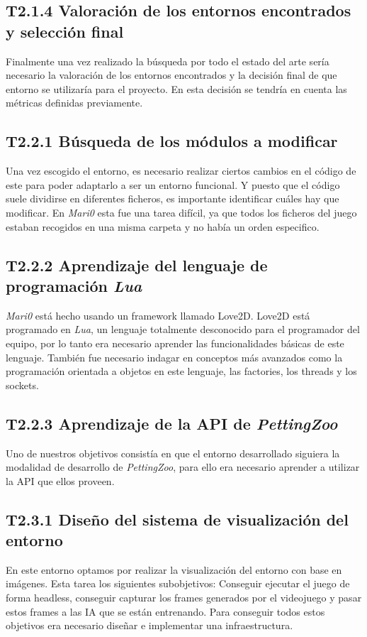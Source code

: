 \subsection*{T2.1.4 Valoración de los entornos encontrados y selección final}
Finalmente una vez realizado la búsqueda por todo el estado del arte sería necesario la valoración de los entornos encontrados y la decisión final de que entorno se utilizaría para el proyecto. En esta decisión se tendría en cuenta las métricas definidas previamente.

\subsection*{T2.2.1 Búsqueda de los módulos a modificar}
Una vez escogido el entorno, es necesario realizar ciertos cambios en el código de este para poder adaptarlo a ser un entorno funcional. Y puesto que el código suele dividirse en diferentes ficheros, es importante identificar cuáles hay que modificar. En \textit{Mari0} esta fue una tarea difícil, ya que todos los ficheros del juego estaban recogidos en una misma carpeta y no había un orden especifico.

\subsection*{T2.2.2 Aprendizaje del lenguaje de programación \textit{Lua}}
\textit{Mari0} está hecho usando un framework llamado Love2D. Love2D está programado en \textit{Lua}, un lenguaje totalmente desconocido para el programador del equipo, por lo tanto era necesario aprender las funcionalidades básicas de este lenguaje. También fue necesario indagar en conceptos más avanzados como la programación orientada a objetos en este lenguaje, las factories, los threads y los sockets.

\subsection*{T2.2.3 Aprendizaje de la API de \textit{PettingZoo}}
Uno de nuestros objetivos consistía en que el entorno desarrollado siguiera la modalidad de desarrollo de \textit{PettingZoo}, para ello era necesario aprender a utilizar la API que ellos proveen.

\subsection*{T2.3.1 Diseño del sistema de visualización del entorno}
En este entorno optamos por realizar la visualización del entorno con base en imágenes. Esta tarea los siguientes subobjetivos: Conseguir ejecutar el juego de forma headless, conseguir capturar los frames generados por el videojuego y pasar estos frames a las IA que se están entrenando. Para conseguir todos estos objetivos era necesario diseñar e implementar una infraestructura.


